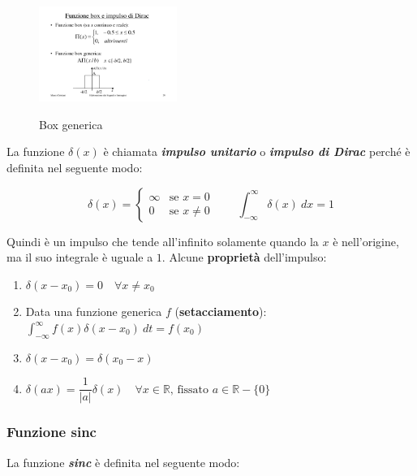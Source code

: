 \documentclass[a4paper]{article}
\begin{document}
	\begin{figure}[!htp]
		\centering
		\includegraphics[width=0.4\textwidth]{img/box.pdf}\label{box}
		\caption{Box generica}
	\end{figure}

	La funzione $\delta(x)$ è chiamata \textbf{\emph{impulso unitario}} o \textbf{\emph{impulso di Dirac}} perché è definita nel seguente modo:
	
	\begin{equation*}
		\delta(x) = 
		\begin{cases}
			\infty  & \text{se } x=0 \\
			0		& \text{se } x\ne 0
		\end{cases}
		\hspace{2em} \int_{-\infty}^{\infty} \delta(x)\: dx = 1
	\end{equation*}

	\noindent
	Quindi è un impulso che tende all'infinito solamente quando la $x$ è nell'origine, ma il suo integrale è uguale a $1$. Alcune \textbf{proprietà} dell'impulso:
	
	\begin{enumerate}
		\item $\delta(x-x_0) = 0 \hspace{1em} \forall x\ne x_0$
		\item Data una funzione generica $f$ (\textbf{setacciamento}): $\displaystyle \int_{-\infty}^{\infty} f(x)\delta(x-x_0)\: dt = f(x_0)$
		\item $\delta(x - x_0) = \delta(x_0 - x)$
		\item $\delta(ax) = \dfrac{1}{|a|} \delta(x) \hspace{1em} \forall x \in \mathbb{R} \text{, fissato } a \in \mathbb{R}-\{0\}$
	\end{enumerate}

	\newpage
	
	\subsubsection{Funzione sinc}
	
	La funzione \textbf{\emph{sinc}} è definita nel seguente modo:
	
\end{document}
